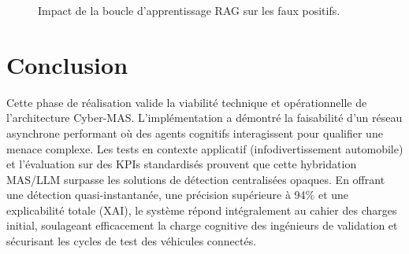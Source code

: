 \documentclass[a4paper, 12pt]{report}
\begin{document}
\begin{figure}[H]
    \centering
    \caption[Impact du RAG sur les faux positifs]{Impact de la boucle d'apprentissage RAG sur les faux positifs.}
    \label{fig:fpr_rag_chart}
\end{figure}

\section*{Conclusion}
Cette phase de réalisation valide la viabilité technique et opérationnelle de l'architecture Cyber-MAS. L'implémentation a démontré la faisabilité d'un réseau asynchrone performant où des agents cognitifs interagissent pour qualifier une menace complexe. Les tests en contexte applicatif (infodivertissement automobile) et l'évaluation sur des KPIs standardisés prouvent que cette hybridation MAS/LLM surpasse les solutions de détection centralisées opaques. En offrant une détection quasi-instantanée, une précision supérieure à 94\% et une explicabilité totale (XAI), le système répond intégralement au cahier des charges initial, soulageant efficacement la charge cognitive des ingénieurs de validation et sécurisant les cycles de test des véhicules connectés.
\end{document}

